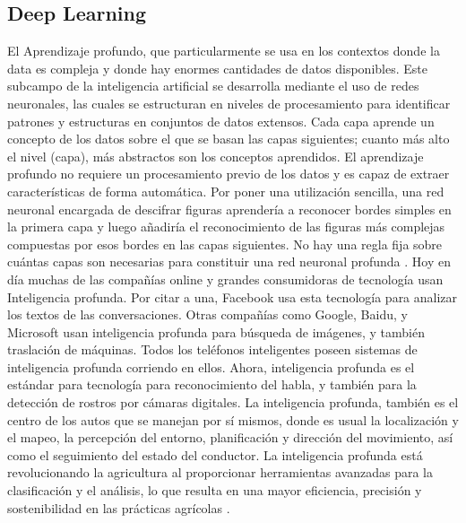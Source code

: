 \subsection{Deep Learning}
El Aprendizaje profundo, que particularmente se usa en los contextos donde la data es compleja y donde hay enormes cantidades de datos disponibles. Este subcampo de la inteligencia artificial se desarrolla mediante el uso de redes neuronales, las cuales se estructuran en niveles de procesamiento para identificar patrones y estructuras en conjuntos de datos extensos. Cada capa aprende un concepto de los datos sobre el que se basan las capas siguientes; cuanto más alto el nivel (capa), más abstractos son los conceptos aprendidos. El aprendizaje profundo no requiere un procesamiento previo de los datos y es capaz de extraer características de forma automática. Por poner una utilización sencilla, una red neuronal encargada de descifrar figuras aprendería a reconocer bordes simples en la primera capa y luego añadiría el reconocimiento de las figuras más complejas compuestas por esos bordes en las capas siguientes. No hay una regla fija sobre cuántas capas son necesarias para constituir una red neuronal profunda \parencites{rusk2016deep}{rouhiainen2018inteligencia}.
Hoy en día muchas de las compañías online y grandes consumidoras de tecnología usan Inteligencia profunda. Por citar a una, Facebook usa esta tecnología para analizar los textos de las conversaciones. Otras compañías como Google, Baidu, y Microsoft usan inteligencia profunda para búsqueda de imágenes, y también traslación de máquinas. Todos los teléfonos inteligentes poseen sistemas de inteligencia profunda corriendo en ellos. Ahora, inteligencia profunda es el estándar para tecnología para reconocimiento del habla, y también para la detección de rostros por cámaras digitales. La inteligencia profunda, también es el centro de los autos que se manejan por sí mismos, donde es usual la localización y el mapeo, la percepción del entorno, planificación y dirección del movimiento, así como el seguimiento del estado del conductor. La inteligencia profunda está revolucionando la agricultura al proporcionar herramientas avanzadas para la clasificación y el análisis, lo que resulta en una mayor eficiencia, precisión y sostenibilidad en las prácticas agrícolas \parencite{kelleher2019deep}.
